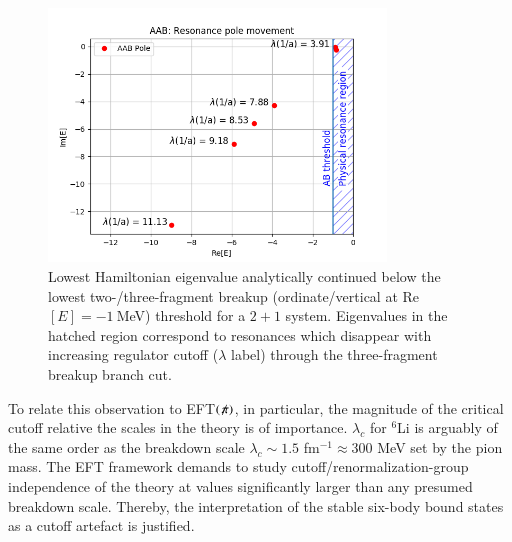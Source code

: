\documentclass[preprint,12pt]{elsarticle}
\newcommand{\lc}{\ensuremath{\lambda_c}}
\newcommand{\eftnopi}{\mbox{EFT$(\not \! \pi)$}}
\newcommand{\tabref}[1]{table~\ref{#1}}
\begin{document}
\begin{figure}[h] 
\centering 
\includegraphics[width=0.8\textwidth]{./AAB_resonance_run.png} 
\caption{Lowest Hamiltonian eigenvalue analytically continued below the lowest
two-/three-fragment breakup (ordinate/vertical at Re$[E]=-1~$MeV) threshold
for a $2+1$ system. Eigenvalues in the hatched region correspond to resonances
which disappear with increasing regulator cutoff ($\lambda$ label) through the
three-fragment breakup branch cut.}
\label{fig:poletrajectory}
\end{figure}

To relate this observation to \eftnopi, in particular,
the magnitude of the critical cutoff relative the scales in the theory is of importance.
$\lc$ for $^6$Li is arguably of the same order as the breakdown scale $\lc\sim1.5$ fm$^{-1} \approx300$ MeV set by
the pion mass.
The EFT framework demands to study cutoff/renormalization-group independence of the theory at values
significantly larger than any presumed breakdown scale.
Thereby, the interpretation of the stable six-body bound states as a cutoff artefact is justified.
\end{document}
